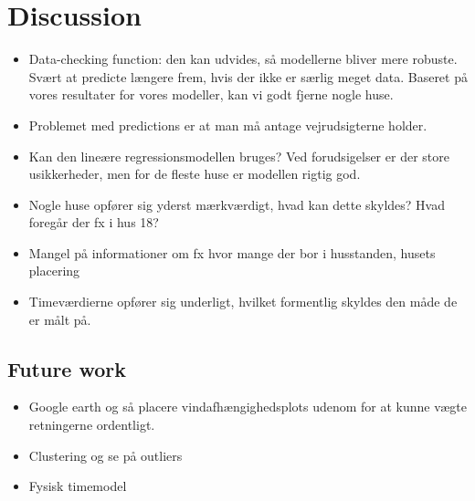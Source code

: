 \chapter{Discussion}
\label{chap: discussion}

\begin{itemize}
    \item Data-checking function: den kan udvides, så modellerne bliver mere robuste. Svært at predicte længere frem, hvis der ikke er særlig meget data. Baseret på vores resultater for vores modeller, kan vi godt fjerne nogle huse.
    \item Problemet med predictions er at man må antage vejrudsigterne holder.
    \item Kan den lineære regressionsmodellen bruges? Ved forudsigelser er der store usikkerheder, men for de fleste huse er modellen rigtig god. 
    \item Nogle huse opfører sig yderst mærkværdigt, hvad kan dette skyldes? Hvad foregår der fx i hus 18?
    \item Mangel på informationer om fx hvor mange der bor i husstanden, husets placering 
    \item Timeværdierne opfører sig underligt, hvilket formentlig skyldes den måde de er målt på. 
\end{itemize}

\section{Future work}
\begin{itemize}
    \item Google earth og så placere vindafhængighedsplots udenom for at kunne vægte retningerne ordentligt. 
    \item Clustering og se på outliers
    \item Fysisk timemodel 
\end{itemize}